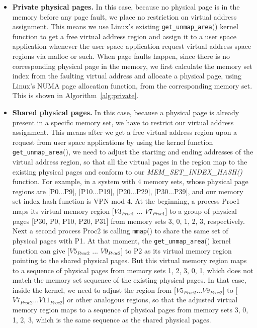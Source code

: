 \begin{itemize}
  \item \textbf{Private physical pages.} In this case, because no
    physical page is in the memory before any page fault, we place no
    restriction on virtual address assignment.  This means we use
    Linux’s existing \verb|get_unmap_area|() kernel function to get a
    free virtual address region and assign it to a user space
    application whenever the user space application request virtual
    address space regions via malloc or such.  When page faults
    happen, since there is no corresponding physical page in the
    memory, we first calculate the memory set index from the faulting
    virtual address and allocate a physical page, using Linux's NUMA
    page allocation function, from the corresponding memory set. This
    is shown in Algorithm~\ref{alg:private}.
  
  \item \textbf{Shared physical pages.} In this case, because a
    physical page is already present in a specific memory set, we have
    to restrict our virtual address assignment.  This means after we
    get a free virtual address region upon a request from user space
    applications by using the kernel function \verb|get_unmap_area|(),
    we need to adjust the starting and ending addresses of the virtual
    address region, so that all the virtual pages in the region map to
    the existing physical pages and conform to our {\it
      MEM\_SET\_INDEX\_HASH()} function. For example, in a system with
    4 memory sets, whose physical page regions are [P0...P9],
    [P10...P19], [P20...P29], [P30...P39], and our memory set index
    hash function is VPN mod 4.  At the beginning, a process Proc1
    maps its virtual memory region [$V3_{Proc1}$ ... $V7_{Proc1}$] to
    a group of physical pages [P30, P0, P10, P20, P31] from memory
    sets 3, 0, 1, 2, 3, respectively.  Next a second process Proc2 is
    calling \verb|mmap|() to share the same set of physical pages with
    P1. At that moment, the \verb|get_unmap_area|() kernel function
    can give [$V5_{Proc2}$ ... $V9_{Proc2}$] to P2 as its virtual
    memory region pointing to the shared physical pages. But this
    virtual memory region maps to a sequence of physical pages from
    memory sets 1, 2, 3, 0, 1, which does not match the memory set
    sequence of the existing physical pages.  In that case, inside the
    kernel, we need to adjust the region from
    [$V5_{Proc2}...V9_{Proc2}$] to [$V7_{Proc2}...V11_{Proc2}$] or
    other analogous regions, so that the adjusted virtual memory
    region maps to a sequence of physical pages from memory sets 3, 0,
    1, 2, 3, which is the same sequence as the shared physical pages.


\end{itemize}
